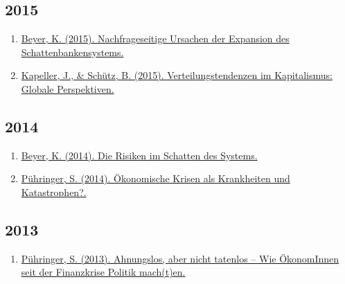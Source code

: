 \subsection*{2015}
\begin{enumerate}
	 \item \href{https://www.awblog.at/Allgemein/nachfrageseitige-ursachen-der-expansion-des-schattenbankensyst}{Beyer, K. (2015). Nachfrageseitige Ursachen der Expansion des Schattenbankensystems.}
	 \item \href{https://www.awblog.at/Allgemein/verteilungstene-perspektiven}{Kapeller, J., \& Schütz, B. (2015). Verteilungstendenzen im Kapitalismus: Globale Perspektiven.}
\end{enumerate}
\subsection*{2014}
\begin{enumerate}
	 \item \href{https://www.awblog.at/Europa/die-risiken-im-schatten-des-systems}{Beyer, K. (2014). Die Risiken im Schatten des Systems.}
	 \item \href{https://www.awblog.at/Europa/oekonomische-krisen-als-krankheiten-und-katastrophen}{Pühringer, S. (2014). Ökonomische Krisen als Krankheiten und Katastrophen?.}
\end{enumerate}
\subsection*{2013}
\begin{enumerate}
	 \item \href{https://www.awblog.at/Wirtschaft/ahnungslos-aber-nicht-tatenlos-wie-die-deutschsprachigen-okono}{Pühringer, S. (2013). Ahnungslos, aber nicht tatenlos – Wie ÖkonomInnen seit der Finanzkrise Politik mach(t)en.}
\end{enumerate}
